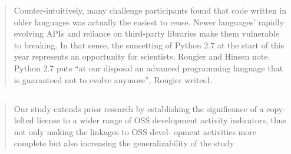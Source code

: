 \begin{quotation}
Counter-intuitively, many challenge participants found that code written in
older languages was actually the easiest to reuse. Newer languages’ rapidly
evolving APIs and reliance on third-party libraries make them vulnerable to
breaking. In that sense, the sunsetting of Python 2.7 at the start of this year
represents an opportunity for scientists, Rougier and Hinsen note. Python 2.7
puts “at our disposal an advanced programming language that is guaranteed not to
evolve anymore”, Rougier writes1.
\end{quotation}

\subsection{\cite{colazo_licence_2009}}

\begin{quotation}
    Our study extends prior research by establishing the signiﬁcance of a copy-
lefted license to a wider range of OSS development activity indicators, thus not
only making the linkages to OSS devel- opment activities more complete but also
increasing the generalizability of the study
\end{quotation}

\subsection{\cite{robert_reproducibility_2020}}

